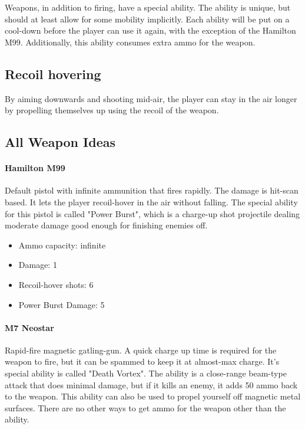 \documentclass[12pt]{article}
\begin{document}
Weapons, in addition to firing, have a special ability. The ability is unique, but should at least allow for some mobility implicitly. Each ability will be put on a cool-down before the player can use it again, with the exception of the Hamilton M99. Additionally, this ability consumes extra ammo for the weapon.

\subsection{Recoil hovering}

By aiming downwards and shooting mid-air, the player can stay in the air longer by propelling themselves up using the recoil of the weapon. 

\subsection{All Weapon Ideas}

\paragraph{Hamilton M99} 

Default pistol with infinite ammunition that fires rapidly. The damage is hit-scan based. It lets the player recoil-hover in the air without falling. The special ability for this pistol is called "Power Burst", which is a charge-up shot projectile dealing moderate damage good enough for finishing enemies off. 

\begin{itemize}
	\item Ammo capacity: infinite
	\item Damage: 1
	\item Recoil-hover shots: 6
	\item Power Burst Damage: 5
\end{itemize}

\paragraph{M7 Neostar}

Rapid-fire magnetic gatling-gun. A quick charge up time is required for the weapon to fire, but it can be spammed to keep it at almost-max charge. It's special ability is called "Death Vortex". The ability is a close-range beam-type attack that does minimal damage, but if it kills an enemy, it adds 50 ammo back to the weapon. This ability can also be used to propel yourself off magnetic metal surfaces. There are no other ways to get ammo for the weapon other than the ability.
\end{document}
